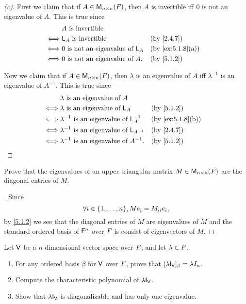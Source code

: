\begin{proof}[(c)]
  First we claim that if \(A \in \mathsf{M}_{{n} \times n}({\mathit{F}})\), then \(A\) is invertible iff \(0\) is not an eigenvalue of \(A\).
  This is true since
  \begin{align*}
         & A \text{ is invertible}                                                     \\
    \iff & \L_A \text{ is invertible}              &  & \text{(by \cref{2.4.7})}       \\
    \iff & 0 \text{ is not an eigenvalue of } \L_A &  & \text{(by \cref{ex:5.1.8}(a))} \\
    \iff & 0 \text{ is not an eigenvalue of } A.   &  & \text{(by \cref{5.1.2})}
  \end{align*}

  Now we claim that if \(A \in \mathsf{M}_{{n} \times n}({\mathit{F}})\), then \(\lambda\) is an eigenvalue of \(A\) iff \(\lambda^{-1}\) is an eigenvalue of \(A^{-1}\).
  This is true since
  \begin{align*}
         & \lambda \text{ is an eigenvalue of } A                                                    \\
    \iff & \lambda \text{ is an eigenvalue of } \L_A             &  & \text{(by \cref{5.1.2})}       \\
    \iff & \lambda^{-1} \text{ is an eigenvalue of } \L_A^{-1}   &  & \text{(by \cref{ex:5.1.8}(b))} \\
    \iff & \lambda^{-1} \text{ is an eigenvalue of } \L_{A^{-1}} &  & \text{(by \cref{2.4.7})}       \\
    \iff & \lambda^{-1} \text{ is an eigenvalue of } A^{-1}.     &  & \text{(by \cref{5.1.2})}
  \end{align*}
\end{proof}

\begin{ex}\label{ex:5.1.9}
  Prove that the eigenvalues of an upper triangular matrix \(M \in \mathsf{M}_{{n} \times n}({\mathit{F}})\) are the diagonal entries of \(M\).
\end{ex}

\begin{proof}[]
  Since
  \[
    \forall i \in \set{1, \dots, n}, M e_i = M_{i i} e_i,
  \]
  by \cref{5.1.2} we see that the diagonal entries of \(M\) are eigenvalues of \(M\) and the standard ordered basis of \(\mathsf{F}^n\) over \(\mathit{F}\) is consist of eigenvectors of \(M\).
\end{proof}

\begin{ex}\label{ex:5.1.10}
  Let \(\mathsf{V}\) be a \(n\)-dimensional vector space over \(\mathit{F}\), and let \(\lambda \in \mathit{F}\).
  \begin{enumerate}
    \item For any ordered basis \(\beta\) for \(\mathsf{V}\) over \(\mathit{F}\), prove that \([\lambda \IT[\V]]_{\beta} = \lambda I_n\).
    \item Compute the characteristic polynomial of \(\lambda \IT[\V]\).
    \item Show that \(\lambda \IT[\V]\) is diagonalizable and has only one eigenvalue.
  \end{enumerate}
\end{ex}

